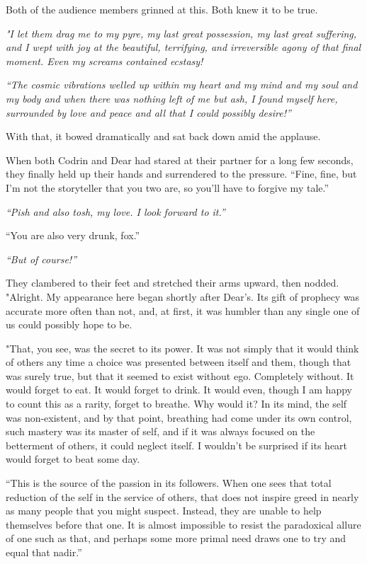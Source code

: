 Both of the audience members grinned at this. Both knew it to be true.

\emph{"I let them drag me to my pyre, my last great possession, my last great suffering, and I wept with joy at the beautiful, terrifying, and irreversible agony of that final moment. Even my screams contained ecstasy!}

\emph{``The cosmic vibrations welled up within my heart and my mind and my soul and my body and when there was nothing left of me but ash, I found myself here, surrounded by love and peace and all that I could possibly desire!''}

With that, it bowed dramatically and sat back down amid the applause.

When both Codrin and Dear had stared at their partner for a long few seconds, they finally held up their hands and surrendered to the pressure. ``Fine, fine, but I'm not the storyteller that you two are, so you'll have to forgive my tale.''

\emph{``Pish and also tosh, my love. I look forward to it.''}

``You are also very drunk, fox.''

\emph{``But of course!''}

They clambered to their feet and stretched their arms upward, then nodded. "Alright. My appearance here began shortly after Dear's. Its gift of prophecy was accurate more often than not, and, at first, it was humbler than any single one of us could possibly hope to be.

"That, you see, was the secret to its power. It was not simply that it would think of others any time a choice was presented between itself and them, though that was surely true, but that it seemed to exist without ego. Completely without. It would forget to eat. It would forget to drink. It would even, though I am happy to count this as a rarity, forget to breathe. Why would it? In its mind, the self was non-existent, and by that point, breathing had come under its own control, such mastery was its master of self, and if it was always focused on the betterment of others, it could neglect itself. I wouldn't be surprised if its heart would forget to beat some day.

``This is the source of the passion in its followers. When one sees that total reduction of the self in the service of others, that does not inspire greed in nearly as many people that you might suspect. Instead, they are unable to help themselves before that one. It is almost impossible to resist the paradoxical allure of one such as that, and perhaps some more primal need draws one to try and equal that nadir.''

